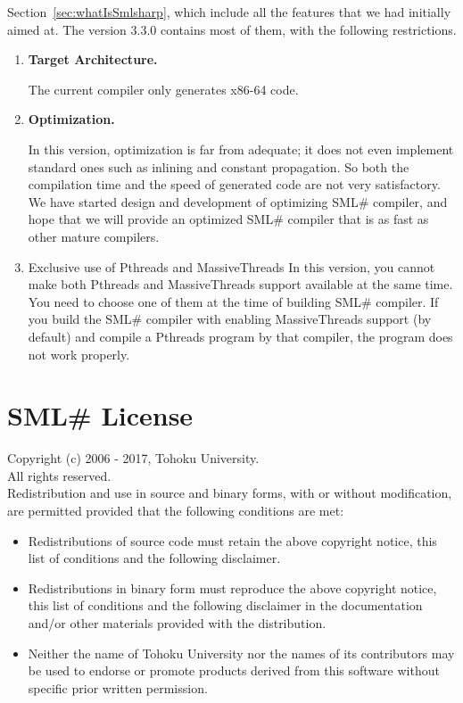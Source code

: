 \documentclass{jbook}
\newcommand{\txt}[2]{#2}
\newcommand{\smlsharp}{SML\#}
\newcommand{\version}{3.3.0}
\begin{document}
Section~\ref{sec:whatIsSmlsharp}, which include all the features that we
had initially aimed at. 
	The version \version{} contains most of them, with the following 
restrictions.
\begin{enumerate}
\item {\bf Target Architecture.}

	The current compiler only generates x86-64 code.

\item {\bf Optimization.}

	In this version, optimization is far from adequate; it does not
even implement standard ones such as inlining and constant propagation.
	So both the compilation time and the speed of generated code are
not very satisfactory.
	We have started design and development of optimizing \smlsharp{}
compiler, and hope that we will provide an optimized \smlsharp{}
compiler that is as fast as other mature compilers.

\item {Exclusive use of Pthreads and MassiveThreads}
	In this version, you cannot make both Pthreads and MassiveThreads
support available at the same time.
	You need to choose one of them at the time of building
\smlsharp{} compiler.
	If you build the \smlsharp{} compiler with enabling MassiveThreads
support (by default) and compile a Pthreads program by that compiler,
the program does not work properly.

\end{enumerate}
\fi%

\chapter{\txt{\smlsharp{}ライセンス}{\smlsharp{} License}}
\label{sec:smlsharpLicence}

Copyright (c) 2006 - 2017, Tohoku University.\\
All rights reserved.\\

Redistribution and use in source and binary forms, with or without
modification, are permitted provided that the following conditions are
met:

\begin{itemize}
\item 
  Redistributions of source code must retain the above copyright
  notice, this list of conditions and the following disclaimer. 
\item 
  Redistributions in binary form must reproduce the above
  copyright notice, this list of conditions and the following disclaimer
  in the documentation and/or other materials provided with the
  distribution. 
\item 
  Neither the name of Tohoku University nor the names of its
  contributors may be used to endorse or promote products derived from
  this software without specific prior written permission.  
\end{itemize}
\end{document}
